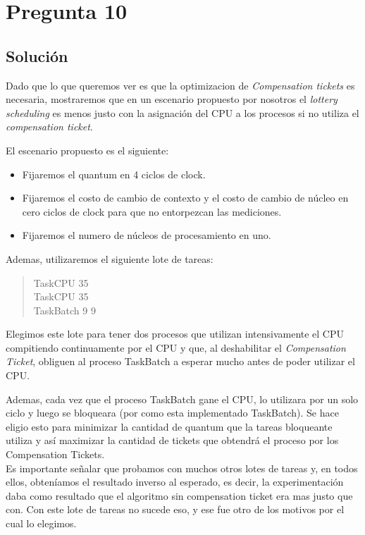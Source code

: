 \section{Pregunta 10}



\subsection{Solución}
Dado que lo que queremos ver es que la optimizacion de \textit{Compensation tickets} es necesaria, mostraremos que en un escenario propuesto por nosotros el \textit{lottery scheduling} es menos justo con la asignación del CPU a los procesos si no utiliza el \textit{compensation ticket}.

El escenario propuesto es el siguiente:
\begin{itemize}
	\item Fijaremos el quantum en 4 ciclos de clock.
	\item Fijaremos el costo de cambio de contexto y el costo de cambio de núcleo en cero ciclos de clock para que no entorpezcan las mediciones.
	\item Fijaremos el numero de núcleos de procesamiento en uno.
\end{itemize}


Ademas, utilizaremos el siguiente lote de tareas:
\begin{quote}
TaskCPU 35\\
TaskCPU 35\\
TaskBatch 9 9\\
\end{quote}


Elegimos este lote para tener dos procesos que utilizan intensivamente el CPU compitiendo continuamente por el CPU y que, al deshabilitar el \textit{Compensation Ticket}, obliguen al proceso TaskBatch a esperar mucho antes de poder utilizar el CPU.

Ademas, cada vez que el proceso TaskBatch gane el CPU, lo utilizara por un solo ciclo y luego se bloqueara (por como esta implementado TaskBatch).
Se hace eligio esto para minimizar la cantidad de quantum que la tareas bloqueante utiliza y así maximizar la cantidad de tickets que obtendrá el proceso por los Compensation Tickets.\\

Es importante señalar que probamos con muchos otros lotes de tareas y, en todos ellos, obteníamos el resultado inverso al esperado, es decir, la experimentación daba como resultado que el algoritmo sin compensation ticket era mas justo que con.
Con este lote de tareas no sucede eso, y ese fue otro de los motivos por el cual lo elegimos.

